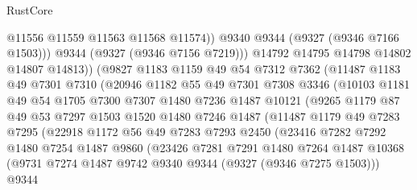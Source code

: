 \begin{lexlean}{RustCore}
\begin{coremodule}
                          @11556
                          @11559
                          @11563
                          @11568
                          @11574))
                      @9340
                      @9344
                      (@9327 (@9346 @7166 @1503)))
                    @9344
                    (@9327 (@9346 @7156 @7219)))
                  @14792
                  @14795
                  @14798
                  @14802
                  @14807
                  @14813))
              (@9827
                @1183
                @1159
                @49
                @54
                @7312
                @7362
                (@11487
                  @1183
                  @49
                  @7301
                  @7310
                  (@20946
                    @1182
                    @55
                    @49
                    @7301
                    @7308
                    @3346
                    (@10103
                      @1181
                      @49
                      @54
                      @1705
                      @7300
                      @7307
                      @1480
                      @7236
                      @1487
                      @10121
                      (@9265
                        @1179
                        @87
                        @49
                        @53
                        @7297
                        @1503
                        @1520
                        @1480
                        @7246
                        @1487
                        (@11487
                          @1179
                          @49
                          @7283
                          @7295
                          (@22918
                            @1172
                            @56
                            @49
                            @7283
                            @7293
                            @2450
                            (@23416
                              @7282
                              @7292
                              @1480
                              @7254
                              @1487
                              @9860
                              (@23426
                                @7281
                                @7291
                                @1480
                                @7264
                                @1487
                                @10368
                                (@9731 @7274 @1487 @9742 @9340 @9344 (@9327 (@9346 @7275 @1503)))
                                @9344

\end{coremodule}
\end{lexlean}

